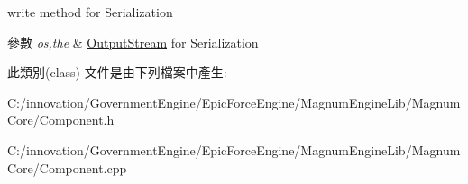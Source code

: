 write method for Serialization 


\begin{DoxyParams}{參數}
{\em os,the} & \hyperlink{class_i_dream_sky_1_1_output_stream}{Output\+Stream} for Serialization \\
\hline
\end{DoxyParams}


此類別(class) 文件是由下列檔案中產生\+:\begin{DoxyCompactItemize}
\item 
C\+:/innovation/\+Government\+Engine/\+Epic\+Force\+Engine/\+Magnum\+Engine\+Lib/\+Magnum\+Core/Component.\+h\item 
C\+:/innovation/\+Government\+Engine/\+Epic\+Force\+Engine/\+Magnum\+Engine\+Lib/\+Magnum\+Core/Component.\+cpp\end{DoxyCompactItemize}
